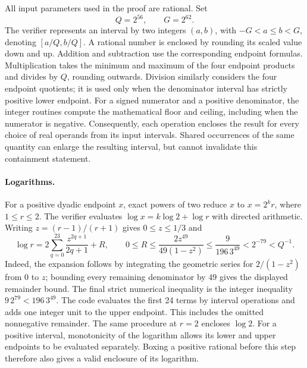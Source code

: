 \documentclass[11pt,a4paper]{article}
\begin{document}
All input parameters used in the proof are rational.  Set
\[
 Q=2^{56},\qquad G=2^{62}.
\]
The verifier represents an interval by two integers $(a,b)$, with
$-G<a\le b<G$, denoting $[a/Q,b/Q]$.  A rational number is enclosed by
rounding its scaled value down and up.  Addition and subtraction use the
corresponding endpoint formulas.  Multiplication takes the minimum and
maximum of the four endpoint products and divides by $Q$, rounding outwards.
Division similarly considers the four endpoint quotients; it is used only
when the denominator interval has strictly positive lower endpoint.
For a signed numerator and a positive denominator, the integer routines
compute the mathematical floor and ceiling, including when the numerator is
negative.  Consequently, each operation encloses the result for every choice
of real operands from its input intervals.  Shared occurrences of the same
quantity can enlarge the resulting interval, but cannot invalidate this
containment statement.

\paragraph{Logarithms.}
For a positive dyadic endpoint $x$, exact powers of two reduce $x$ to
$x=2^k r$, where $1\le r\le2$.  The verifier evaluates
$\log x=k\log2+\log r$ with directed arithmetic.  Writing
$z=(r-1)/(r+1)$ gives $0\le z\le1/3$ and
\[
 \log r=2\sum_{q=0}^{23}\frac{z^{2q+1}}{2q+1}+R,
 \qquad
 0\le R\le
 \frac{2z^{49}}{49(1-z^2)}
 \le\frac{9}{196\,3^{49}}<2^{-79}<Q^{-1}.
\]
Indeed, the expansion follows by integrating the geometric series for
$2/(1-z^2)$ from $0$ to $z$; bounding every remaining denominator by $49$
gives the displayed remainder bound.  The final strict numerical inequality
is the integer inequality $9\,2^{79}<196\,3^{49}$.
The code evaluates the first 24 terms by interval operations and adds one
integer unit to the upper endpoint.  This includes the omitted nonnegative
remainder.  The same procedure at $r=2$ encloses $\log2$.
For a positive interval, monotonicity of the logarithm allows its lower and
upper endpoints to be evaluated separately.  Boxing a positive rational
before this step therefore also gives a valid enclosure of its logarithm.
\end{document}
